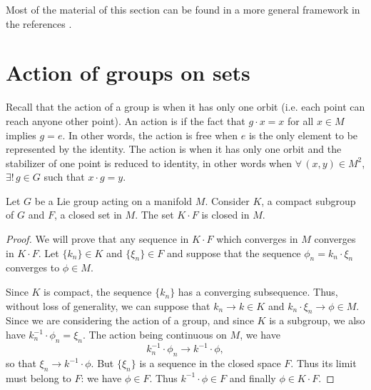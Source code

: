 
Most of the material of this section can be found in a more general framework in the references \cite{Helgason, Loos, kobayashi, kobayashi2}. 

\section{Action of groups on sets}

Recall that the action of a group is  when it has only one orbit (i.e. each point can reach anyone other point). An action is   if the fact that $g\cdot x=x$ for all $x\in M$ implies $g=e$. In other words, the action is free when $e$ is the only element to be represented by the identity. The action is  when it has only one orbit and the stabilizer of one point is reduced to identity, in other words when $\forall\,(x,y)\in M^{2}$, $\exists!\,g\in G$ such that $x\cdot g=y$.

\begin{lemma}		\label{LemCompactSurFermeFerme}
	Let $G$ be a Lie group acting on a manifold $M$. Consider $K$, a compact subgroup of $G$ and $F$, a closed set in $M$. The set $K\cdot F$ is closed in $M$.
\end{lemma}

\begin{proof}
	We will prove that any sequence in $K\cdot F$ which converges in $M$ converges in $K\cdot F$. Let $\{ k_n\}\in K$ and $\{ \xi_n\}\in F$ and suppose that the sequence $\phi_n=k_n\cdot \xi_n$ converges to $\phi\in M$.

	Since $K$ is compact, the sequence $\{ k_n \}$ has a converging subsequence. Thus, without loss of generality, we can suppose that $k_n\to k\in K$ and $k_n\cdot \xi_n\to\phi\in M$. Since we are considering the action of a group, and since $K$ is a subgroup, we also have $k^{-1}_n\cdot \phi_n=\xi_n$. The action being continuous on $M$, we have
	\begin{equation}
		k_n^{-1}\cdot \phi_n\to k^{-1}\cdot \phi,
	\end{equation}
	so that $\xi_n\to k^{-1}\cdot\phi$. But $\{ \xi_n \}$ is a sequence in the closed space $F$. Thus its limit must belong to $F$: we have $\phi\in F$. Thus $k^{-1}\cdot\phi\in F$ and finally $\phi\in K\cdot F$.
\end{proof}

